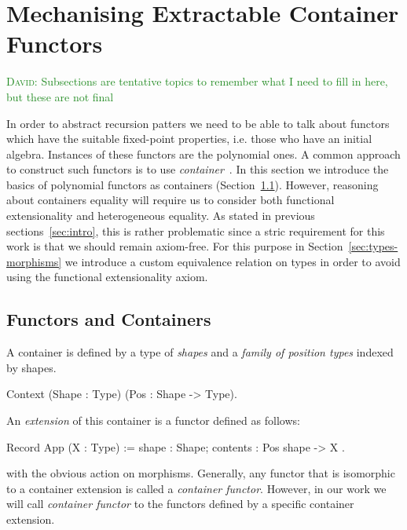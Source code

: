 \documentclass[anonymous, a4paper, UKenglish, cleveref, autoref, thm-restate]{lipics-v2021}
\newcommand{\dcas}[1]{\textcolor{ForestGreen}{\textsc{David}: #1}}
\newcommand{\R}{\mathbb{R}}
\newcommand{\operator}[1]{\textsf{#1}}
\begin{document}

\section{Mechanising Extractable Container Functors}
\dcas{Subsections are tentative topics to remember what I need to fill in here,
but these are not final}

In order to abstract recursion patters we need to be able to talk about functors
which have the suitable fixed-point properties, i.e. those who have an initial
algebra. Instances of these functors are the polynomial ones.  A common approach
to construct such functors is to use \emph{container}~\cite{AbbottAG05}.  In
this section we introduce the basics of polynomial functors as containers
(Section~\ref{sec:containers}).  However, reasoning about containers equality
will require us to consider both functional extensionality and heterogeneous
equality. As stated in previous sections~\ref{sec:intro}, this is rather
problematic since a stric requirement for this work is that we should remain
axiom-free. For this purpose in Section~\ref{sec:types-morphisms} we introduce
a custom equivalence relation on types in order to avoid using the functional
extensionality axiom.

\subsection{Functors and Containers}
\label{sec:containers}
A container is defined by a type of \emph{shapes} and a \emph{family of position
types} indexed by shapes.
\begin{coqcode}
Context (Shape : Type) (Pos : Shape -> Type).
\end{coqcode}
An \emph{extension} of this container is a functor defined as follows:
\begin{coqcode}
Record App (X : Type) := { shape : Shape; contents : Pos shape -> X }.
\end{coqcode}
with the obvious action on morphisms. Generally, any functor that is isomorphic
to a container extension is called a \emph{container functor}. However, in our
work we will call \emph{container functor} to the functors defined by a specific
container extension.
\end{document}
